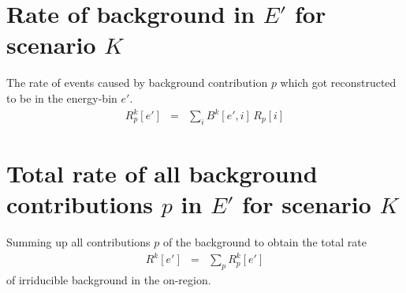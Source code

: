 \documentclass{article}%
\begin{document}
\section{Rate of background in $E'$ for scenario $K$}
%
The rate of events caused by background contribution $p$ which got reconstructed to be in the energy-bin $e'$.
%
\begin{eqnarray}
R^k_p[e'] &=& \sum_{i} B^k[e', i] \, R_p[i]
\end{eqnarray}
%
\section{Total rate of all background contributions $p$ in $E'$ for scenario $K$}
%
Summing up all contributions $p$ of the background to obtain the total rate
%
\begin{eqnarray}
R^k[e'] &=& \sum_{p} R^k_p[e']
\end{eqnarray}
%
of irriducible background in the on-region.
%
%
%
%
\end{document}
